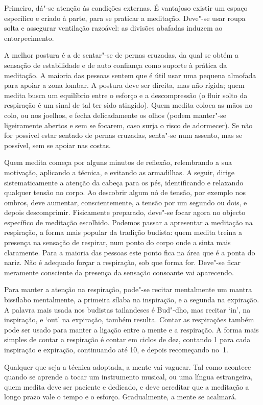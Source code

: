 Primeiro, dá"-se atenção às condições externas. É vantajoso existir um
espaço específico e criado à parte, para se praticar a meditação.
Deve"-se usar roupa solta e assegurar ventilação razoável: as divisões
abafadas induzem ao entorpecimento.

A melhor postura é a de sentar"-se de pernas cruzadas, da qual se obtém a
sensação de estabilidade e de auto confiança como suporte à prática da
meditação. A maioria das pessoas sentem que é útil usar uma pequena
almofada para apoiar a zona lombar. A postura deve ser direita, mas não
rígida; quem medita busca um equilíbrio entre o esforço e a
descompressão (o fluir solto da respiração é um sinal de tal ter sido
atingido). Quem medita coloca as mãos no colo, ou nos joelhos, e fecha
delicadamente os olhos (podem manter"-se ligeiramente abertos e sem se
focarem, caso surja o risco de adormecer). Se não for possível estar
sentado de pernas cruzadas, senta"-se num assento, mas se possível, sem
se apoiar nas costas.

Quem medita começa por alguns minutos de reflexão, relembrando a sua
motivação, aplicando a técnica, e evitando as armadilhas. A seguir,
dirige sistematicamente a atenção da cabeça para os pés, identificando e
relaxando qualquer tensão no corpo. Ao descobrir algum nó de tensão, por
exemplo nos ombros, deve aumentar, conscientemente, a tensão por um
segundo ou dois, e depois descomprimir. Fisicamente preparado, deve"-se
focar agora no objecto específico de meditação escolhido. Podemos passar
a apresentar a meditação na respiração, a forma mais popular da tradição
budista: quem medita treina a presença na sensação de respirar, num
ponto do corpo onde a sinta mais claramente. Para a maioria das pessoas
este ponto fica na área que é a ponta do nariz. Não é adequado forçar a
respiração, sob que forma for. Deve"-se ficar meramente consciente da
presença da sensação consoante vai aparecendo.

Para manter a atenção na respiração, pode"-se recitar mentalmente um
mantra bissílabo mentalmente, a primeira sílaba na inspiração, e a
segunda na expiração. A palavra mais usada nos budistas tailandeses é
Bud"-dho, mas recitar `in', na inspiração, e `out' na expiração,
também resulta. Contar as respirações também pode ser usado para manter
a ligação entre a mente e a respiração. A forma mais simples de contar a
respiração é contar em ciclos de dez, contando 1 para cada inspiração e
expiração, continuando até 10, e depois recomeçando no~1.

Qualquer que seja a técnica adoptada, a mente vai vaguear. Tal como
acontece quando se aprende a tocar um instrumento musical, ou uma língua
estrangeira, quem medita deve ser paciente e dedicado, e deve acreditar
que a meditação a longo prazo vale o tempo e o esforço. Gradualmente, a
mente se acalmará.

